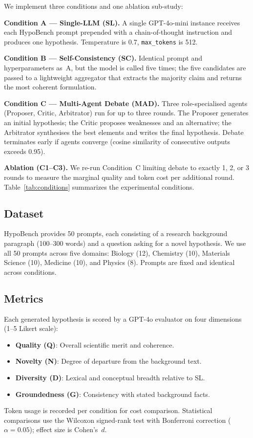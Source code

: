 We implement three conditions and one ablation sub-study:

\textbf{Condition A --- Single-LLM (SL).}  A single GPT-4o-mini instance
receives each HypoBench prompt prepended with a chain-of-thought instruction and
produces one hypothesis.  Temperature is 0.7, \texttt{max\_tokens} is 512.

\textbf{Condition B --- Self-Consistency (SC).}  Identical prompt and
hyperparameters as~A, but the model is called five times; the five candidates are
passed to a lightweight aggregator that extracts the majority claim and returns
the most coherent formulation.

\textbf{Condition C --- Multi-Agent Debate (MAD).}  Three role-specialised agents
(Proposer, Critic, Arbitrator) run for up to three rounds.  The Proposer
generates an initial hypothesis; the Critic proposes weaknesses and an
alternative; the Arbitrator synthesises the best elements and writes the final
hypothesis.  Debate terminates early if agents converge (cosine similarity of
consecutive outputs exceeds 0.95).

\textbf{Ablation (C1--C3).}  We re-run Condition~C limiting debate to exactly
1, 2, or 3 rounds to measure the marginal quality and token cost per additional
round.  Table~\ref{tab:conditions} summarizes the experimental conditions.



\subsection{Dataset}

HypoBench \cite{Liu2025} provides 50 prompts, each consisting of a research
background paragraph (100--300 words) and a question asking for a novel
hypothesis.  We use all 50 prompts across five domains: Biology (12), Chemistry
(10), Materials Science (10), Medicine (10), and Physics (8).  Prompts are fixed
and identical across conditions.

\subsection{Metrics}

Each generated hypothesis is scored by a GPT-4o evaluator on four dimensions
(1--5 Likert scale):
\begin{itemize}
  \item \textbf{Quality (Q)}: Overall scientific merit and coherence.
  \item \textbf{Novelty (N)}: Degree of departure from the background text.
  \item \textbf{Diversity (D)}: Lexical and conceptual breadth relative to SL.
  \item \textbf{Groundedness (G)}: Consistency with stated background facts.
\end{itemize}
Token usage is recorded per condition for cost comparison.  Statistical
comparisons use the Wilcoxon signed-rank test with Bonferroni correction
($\alpha = 0.05$); effect size is Cohen's~$d$.

